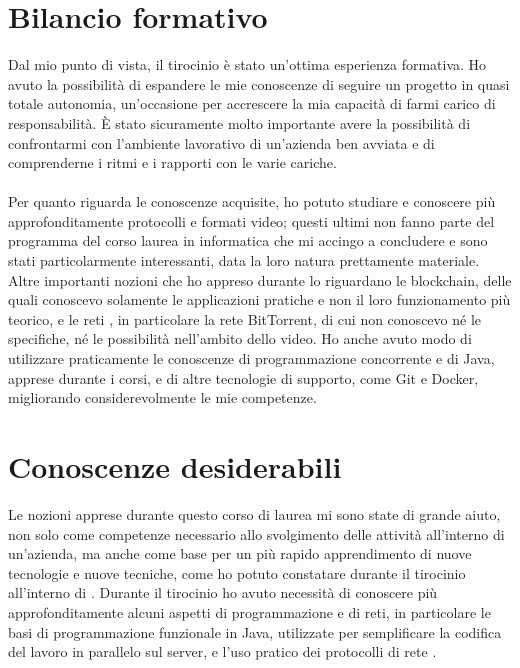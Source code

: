 \section{Bilancio formativo}
Dal mio punto di vista, il tirocinio è stato un'ottima esperienza formativa. Ho avuto la possibilità di espandere le mie conoscenze di seguire un progetto in quasi totale autonomia, un'occasione per accrescere la mia capacità di farmi carico di responsabilità. È stato sicuramente molto importante avere la possibilità di confrontarmi con l'ambiente lavorativo di un'azienda ben avviata e di comprenderne i ritmi e i rapporti con le varie cariche.
\paragraph*{}
Per quanto riguarda le conoscenze acquisite, ho potuto studiare e conoscere più approfonditamente protocolli e formati video; questi ultimi non fanno parte del programma del corso laurea in informatica che mi accingo a concludere e sono stati particolarmente interessanti, data la loro natura prettamente materiale. Altre importanti nozioni che ho appreso durante lo  riguardano le blockchain, delle quali conoscevo solamente le applicazioni pratiche e non il loro funzionamento più teorico, e le reti , in particolare la rete BitTorrent, di cui non conoscevo né le specifiche, né le possibilità nell'ambito dello  video. Ho anche avuto modo di utilizzare praticamente le conoscenze di programmazione concorrente e di Java, apprese durante i corsi, e di altre tecnologie di supporto, come Git e Docker, migliorando considerevolmente le mie competenze.

\section{Conoscenze desiderabili}
Le nozioni apprese durante questo corso di laurea mi sono state di grande aiuto, non solo come competenze necessario allo svolgimento delle attività all'interno di un'azienda, ma anche come base per un più rapido apprendimento di nuove tecnologie e nuove tecniche, come ho potuto constatare durante il tirocinio all'interno di \nomeAzienda{}. Durante il tirocinio ho avuto necessità di conoscere più approfonditamente alcuni aspetti di programmazione e di reti, in particolare le basi di programmazione funzionale in Java, utilizzate per semplificare la codifica del lavoro in parallelo sul server, e l'uso pratico dei protocolli di rete .
